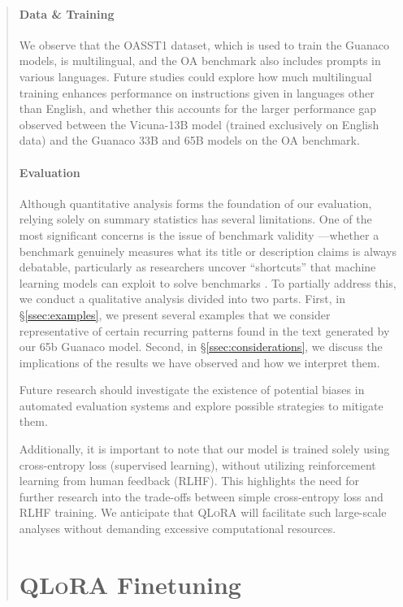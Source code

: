 \begin{quote}
\paragraph{Data \& Training} We observe that the OASST1 dataset, which is used to train the {Guanaco} models, is multilingual, and the OA benchmark also includes prompts in various languages. Future studies could explore how much multilingual training enhances performance on instructions given in languages other than English, and whether this accounts for the larger performance gap observed between the Vicuna-13B model (trained exclusively on English data) and the {Guanaco} 33B and 65B models on the OA benchmark.

\paragraph{Evaluation}

Although quantitative analysis forms the foundation of our evaluation, relying solely on summary statistics has several limitations. One of the most significant concerns is the issue of benchmark validity \citep{liao2021we}—whether a benchmark genuinely measures what its title or description claims is always debatable, particularly as researchers uncover ``shortcuts'' that machine learning models can exploit to solve benchmarks \citep{gururangan2018annotation, poliak2018hypothesis}. To partially address this, we conduct a qualitative analysis divided into two parts. First, in \S\ref{ssec:examples}, we present several examples that we consider representative of certain recurring patterns found in the text generated by our 65b {Guanaco} model. Second, in \S\ref{ssec:considerations}, we discuss the implications of the results we have observed and how we interpret them.

Future research should investigate the existence of potential biases in automated evaluation systems and explore possible strategies to mitigate them.

Additionally, it is important to note that our model is trained solely using cross-entropy loss (supervised learning), without utilizing reinforcement learning from human feedback (RLHF). This highlights the need for further research into the trade-offs between simple cross-entropy loss and RLHF training. We anticipate that \textsc{QLoRA} will facilitate such large-scale analyses without demanding excessive computational resources.

\section{\textsc{QLoRA} Finetuning}


\end{quote}
